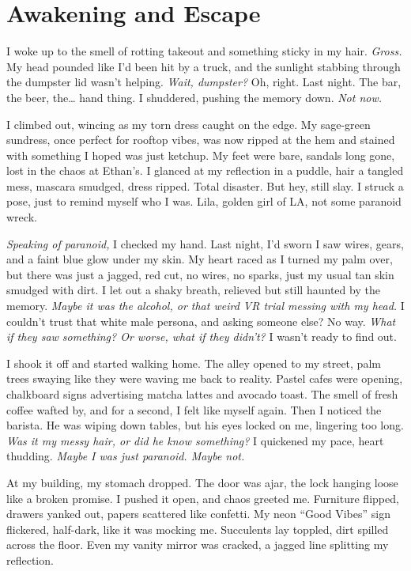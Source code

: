 \documentclass[12pt]{article}
\begin{document}
\section{Awakening and Escape}

I woke up to the smell of rotting takeout and something sticky in my hair. \textit{Gross.} My head pounded like I’d been hit by a truck, and the sunlight stabbing through the dumpster lid wasn’t helping. \textit{Wait, dumpster?} Oh, right. Last night. The bar, the beer, the… hand thing. I shuddered, pushing the memory down. \textit{Not now.}

I climbed out, wincing as my torn dress caught on the edge. My sage-green sundress, once perfect for rooftop vibes, was now ripped at the hem and stained with something I hoped was just ketchup. My feet were bare, sandals long gone, lost in the chaos at \textnormal{Ethan}’s. I glanced at my reflection in a puddle, hair a tangled mess, mascara smudged, dress ripped. Total disaster. But hey, still slay. I struck a pose, just to remind myself who I was. \textnormal{Lila}, golden girl of LA, not some paranoid wreck.

\textit{Speaking of paranoid,} I checked my hand. Last night, I’d sworn I saw wires, gears, and a faint blue glow under my skin. My heart raced as I turned my palm over, but there was just a jagged, red cut, no wires, no sparks, just my usual tan skin smudged with dirt. I let out a shaky breath, relieved but still haunted by the memory. \textit{Maybe it was the alcohol, or that weird VR trial messing with my head.} I couldn’t trust that white male persona, and asking someone else? No way. \textit{What if they saw something? Or worse, what if they didn’t?} I wasn’t ready to find out.

I shook it off and started walking home. The alley opened to my street, palm trees swaying like they were waving me back to reality. Pastel cafes were opening, chalkboard signs advertising matcha lattes and avocado toast. The smell of fresh coffee wafted by, and for a second, I felt like myself again. Then I noticed the barista. He was wiping down tables, but his eyes locked on me, lingering too long. \textit{Was it my messy hair, or did he know something?} I quickened my pace, heart thudding. \textit{Maybe I was just paranoid. Maybe not.}

At my building, my stomach dropped. The door was ajar, the lock hanging loose like a broken promise. I pushed it open, and chaos greeted me. Furniture flipped, drawers yanked out, papers scattered like confetti. My neon “Good Vibes” sign flickered, half-dark, like it was mocking me. Succulents lay toppled, dirt spilled across the floor. Even my vanity mirror was cracked, a jagged line splitting my reflection.
\end{document}
